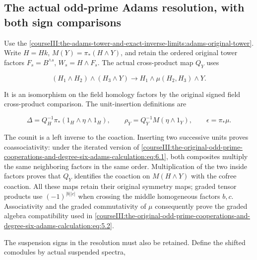 \subsection{The actual odd-prime Adams resolution, with both sign comparisons}
\label{courseIII:the-original-odd-prime-cooperations-and-degree-six-adams-calculation:odd-actual-adams}

\label{courseIII:the-original-odd-prime-cooperations-and-degree-six-adams-calculation:section-6}\label{courseIII:odd-coop:6}

Use the \cref{courseIII:the-adams-tower-and-exact-inverse-limits:adams-original-tower}. Write \(H=Hk\), \(M(Y)=\pi_*(H\wedge Y)\), and retain the ordered original tower factors \(F_s=B^{\wedge s}\), \(W_s=H\wedge F_s\). The actual cross-product map \(Q_Y\) uses

\begin{equation}
(H_1\wedge H_2)\wedge(H_3\wedge Y)
 \longrightarrow H_1\wedge\mu(H_2,H_3)\wedge Y.
 \label{courseIII:the-original-odd-prime-cooperations-and-degree-six-adams-calculation:eq:6.1}
\end{equation}

It is an isomorphism on the field homology factors by the original signed field cross-product comparison. The unit-insertion definitions are

\begin{equation}
\Delta=Q_H^{-1}\pi_*(1_H\wedge\eta\wedge1_H),
 \qquad \rho_Y=Q_Y^{-1}M(\eta\wedge1_Y),
 \qquad \epsilon=\pi_*\mu.
 \label{courseIII:the-original-odd-prime-cooperations-and-degree-six-adams-calculation:eq:6.2}
\end{equation}

The counit is a left inverse to the coaction. Inserting two successive units proves coassociativity: under the iterated version of \eqref{courseIII:the-original-odd-prime-cooperations-and-degree-six-adams-calculation:eq:6.1}, both composites multiply the same neighboring factors in the same order. Multiplication of the two inside factors proves that \(Q_Y\) identifies the coaction on \(M(H\wedge Y)\) with the cofree coaction. All these maps retain their original symmetry maps; graded tensor products use \((-1)^{|b||c|}\) when crossing the middle homogeneous factors \(b,c\). Associativity and the graded commutativity of \(\mu\) consequently prove the graded algebra compatibility used in \eqref{courseIII:the-original-odd-prime-cooperations-and-degree-six-adams-calculation:eq:5.2}.

The suspension signs in the resolution must also be retained. Define the shifted comodules by actual suspended spectra,

